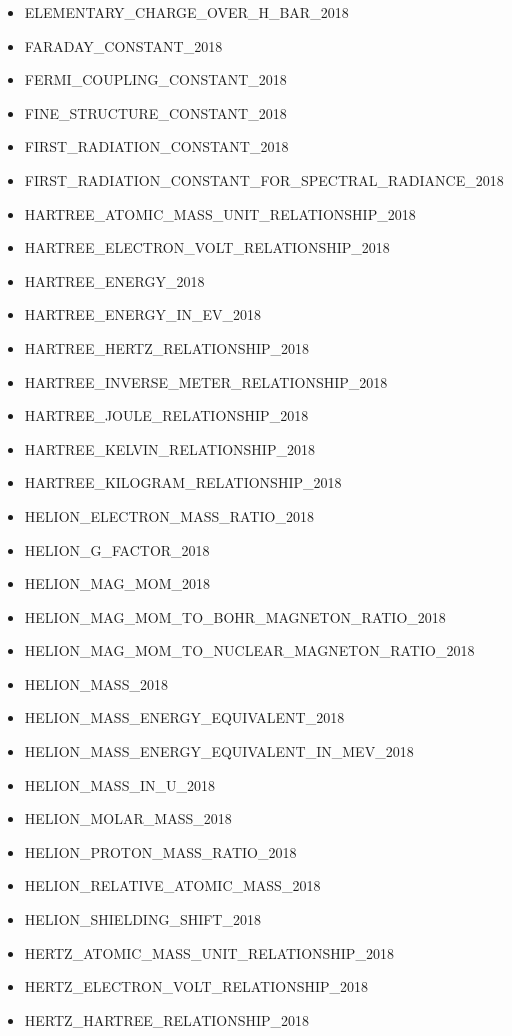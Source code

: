 \begin{itemize}
  ELEMENTARY\_CHARGE\_2018
\item
  ELEMENTARY\_CHARGE\_OVER\_H\_BAR\_2018
\item
  FARADAY\_CONSTANT\_2018
\item
  FERMI\_COUPLING\_CONSTANT\_2018
\item
  FINE\_STRUCTURE\_CONSTANT\_2018
\item
  FIRST\_RADIATION\_CONSTANT\_2018
\item
  FIRST\_RADIATION\_CONSTANT\_FOR\_SPECTRAL\_RADIANCE\_2018
\item
  HARTREE\_ATOMIC\_MASS\_UNIT\_RELATIONSHIP\_2018
\item
  HARTREE\_ELECTRON\_VOLT\_RELATIONSHIP\_2018
\item
  HARTREE\_ENERGY\_2018
\item
  HARTREE\_ENERGY\_IN\_EV\_2018
\item
  HARTREE\_HERTZ\_RELATIONSHIP\_2018
\item
  HARTREE\_INVERSE\_METER\_RELATIONSHIP\_2018
\item
  HARTREE\_JOULE\_RELATIONSHIP\_2018
\item
  HARTREE\_KELVIN\_RELATIONSHIP\_2018
\item
  HARTREE\_KILOGRAM\_RELATIONSHIP\_2018
\item
  HELION\_ELECTRON\_MASS\_RATIO\_2018
\item
  HELION\_G\_FACTOR\_2018
\item
  HELION\_MAG\_MOM\_2018
\item
  HELION\_MAG\_MOM\_TO\_BOHR\_MAGNETON\_RATIO\_2018
\item
  HELION\_MAG\_MOM\_TO\_NUCLEAR\_MAGNETON\_RATIO\_2018
\item
  HELION\_MASS\_2018
\item
  HELION\_MASS\_ENERGY\_EQUIVALENT\_2018
\item
  HELION\_MASS\_ENERGY\_EQUIVALENT\_IN\_MEV\_2018
\item
  HELION\_MASS\_IN\_U\_2018
\item
  HELION\_MOLAR\_MASS\_2018
\item
  HELION\_PROTON\_MASS\_RATIO\_2018
\item
  HELION\_RELATIVE\_ATOMIC\_MASS\_2018
\item
  HELION\_SHIELDING\_SHIFT\_2018
\item
  HERTZ\_ATOMIC\_MASS\_UNIT\_RELATIONSHIP\_2018
\item
  HERTZ\_ELECTRON\_VOLT\_RELATIONSHIP\_2018
\item
  HERTZ\_HARTREE\_RELATIONSHIP\_2018

\end{itemize}
